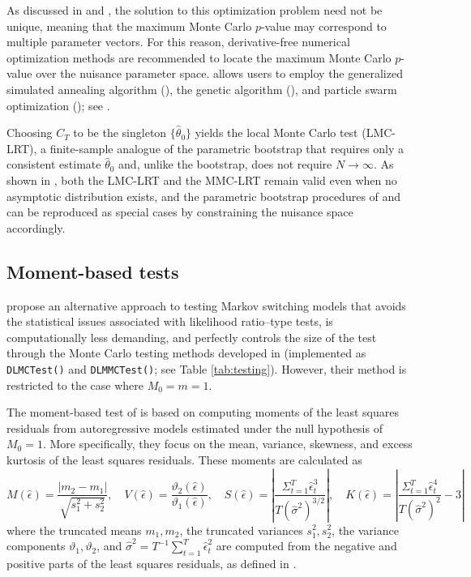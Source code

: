 As discussed in \citet{dufour2006} and \citet{rodrondufour_mcmstest}, the solution to this optimization problem need not be unique, meaning that the maximum Monte Carlo \(p\)-value may correspond to multiple parameter vectors. For this reason, derivative-free numerical optimization methods are recommended to locate the maximum Monte Carlo \(p\)-value over the nuisance parameter space.  allows users to employ the generalized simulated annealing algorithm (), the genetic algorithm (), and particle swarm optimization (); see \citep{xiaetal2013, zametal2013, scrucca2013, dufour2006, dufour2019finite}.

Choosing \(C_T\) to be the singleton \(\{\hat{\theta}_{0}\}\) yields the local Monte Carlo test (LMC-LRT), a finite-sample analogue of the parametric bootstrap that requires only a consistent estimate \(\hat{\theta}_{0}\) and, unlike the bootstrap, does not require \(N\to\infty\). As shown in \citet{rodrondufour_mcmstest}, both the LMC-LRT and the MMC-LRT remain valid even when no asymptotic distribution exists, and the parametric bootstrap procedures of \citet{quzhuo2021likelihood} and \citet{kasshi2018} can be reproduced as special cases by constraining the nuisance space accordingly.

\subsection{Moment-based tests}\label{moment-based-tests}

\citet{dufourluger17} propose an alternative approach to testing Markov switching models that avoids the statistical issues associated with likelihood ratio--type tests, is computationally less demanding, and perfectly controls the size of the test through the Monte Carlo testing methods developed in \citet{dufour2006} (implemented as \texttt{DLMCTest()} and \texttt{DLMMCTest()}; see Table \ref{tab:testing}). However, their method is restricted to the case where \(M_0 = m = 1\).

The moment-based test of \citet{dufourluger17} is based on computing moments of the least squares residuals from autoregressive models estimated under the null hypothesis of \(M_0=1\). More specifically, they focus on the mean, variance, skewness, and excess kurtosis of the least squares residuals. These moments are calculated as
\begin{equation*}
    M(\hat{\epsilon}) = \frac{|m_2 - m_1|}{\sqrt{s^2_1+s^2_2}}, \quad V(\hat{\epsilon}) = \frac{\vartheta_2(\hat{\epsilon})}{\vartheta_1(\hat{\epsilon})}, \quad S(\hat{\epsilon})= | \frac{\Sigma^T_{t=1} \hat{\epsilon}_{t}^3}{T(\hat{\sigma}^2)^{3/2}} |, \quad K(\hat{\epsilon})= | \frac{\Sigma^T_{t=1} \hat{\epsilon}_{t}^4}{T(\hat{\sigma}^2)^{2}} -3|
\end{equation*}
where the truncated means \(m_1, m_2\), the truncated variances \(s_1^2, s_2^2\), the variance components \(\vartheta_1, \vartheta_2\), and \(\hat{\sigma}^2 = T^{-1}\sum_{t=1}^{T}\hat{\epsilon}_t^2\) are computed from the negative and positive parts of the least squares residuals, as defined in \citet{dufourluger17}.


